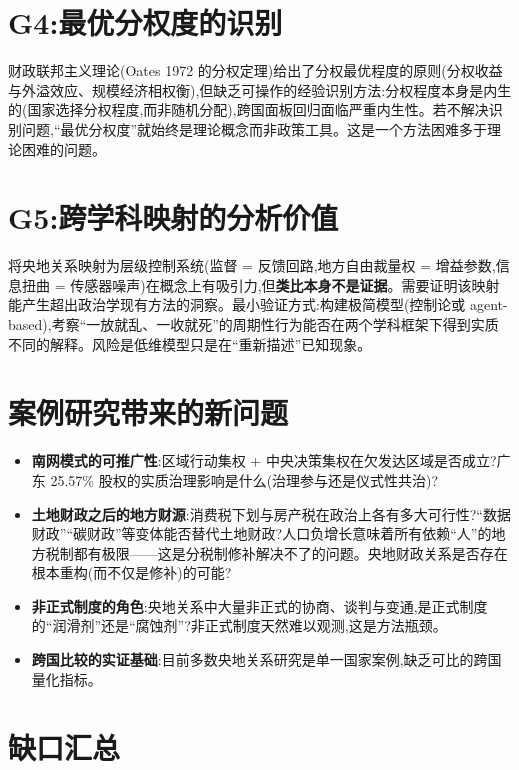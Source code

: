 \documentclass[UTF8,12pt,a4paper]{ctexrep}
\begin{document}
\section{G4:最优分权度的识别}

财政联邦主义理论(Oates 1972 的分权定理)给出了分权最优程度的原则(分权收益与外溢效应、规模经济相权衡),但缺乏可操作的经验识别方法:分权程度本身是内生的(国家选择分权程度,而非随机分配),跨国面板回归面临严重内生性。若不解决识别问题,``最优分权度''就始终是理论概念而非政策工具。这是一个方法困难多于理论困难的问题。

\section{G5:跨学科映射的分析价值}

将央地关系映射为层级控制系统(监督 = 反馈回路,地方自由裁量权 = 增益参数,信息扭曲 = 传感器噪声)在概念上有吸引力,但\textbf{类比本身不是证据}。需要证明该映射能产生超出政治学现有方法的洞察。最小验证方式:构建极简模型(控制论或 agent-based),考察``一放就乱、一收就死''的周期性行为能否在两个学科框架下得到实质不同的解释。风险是低维模型只是在``重新描述''已知现象。

\section{案例研究带来的新问题}

\begin{itemize}
  \item \textbf{南网模式的可推广性}:区域行动集权 + 中央决策集权在欠发达区域是否成立?广东 25.57\% 股权的实质治理影响是什么(治理参与还是仪式性共治)?
  \item \textbf{土地财政之后的地方财源}:消费税下划与房产税在政治上各有多大可行性?``数据财政''``碳财政''等变体能否替代土地财政?人口负增长意味着所有依赖``人''的地方税制都有极限——这是分税制修补解决不了的问题。央地财政关系是否存在根本重构(而不仅是修补)的可能?
  \item \textbf{非正式制度的角色}:央地关系中大量非正式的协商、谈判与变通,是正式制度的``润滑剂''还是``腐蚀剂''?非正式制度天然难以观测,这是方法瓶颈。
  \item \textbf{跨国比较的实证基础}:目前多数央地关系研究是单一国家案例,缺乏可比的跨国量化指标。
\end{itemize}

\section{缺口汇总}
\end{document}
